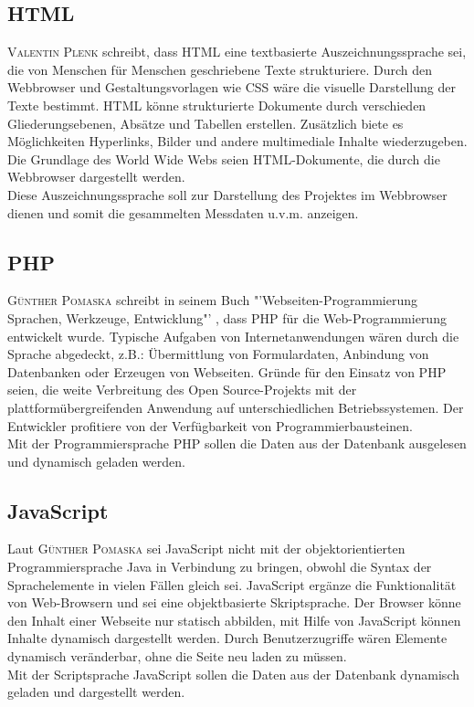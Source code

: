 \subsection{\ac{HTML}}
\textsc{Valentin Plenk}\cite{plenk2017angewandte} schreibt, dass \ac{HTML} eine textbasierte Auszeichnungssprache sei, die von Menschen für Menschen geschriebene Texte strukturiere. Durch den Webbrowser und Gestaltungsvorlagen wie \ac{CSS} wäre die visuelle Darstellung der Texte bestimmt. \ac{HTML} könne strukturierte Dokumente durch verschieden Gliederungsebenen, Absätze und Tabellen erstellen. Zusätzlich biete es Möglichkeiten Hyperlinks, Bilder und andere multimediale Inhalte wiederzugeben. Die Grundlage des World Wide Webs seien \ac{HTML}-Dokumente, die durch die Webbrowser dargestellt werden. \\
Diese Auszeichnungssprache soll zur Darstellung des Projektes im Webbrowser dienen und somit die gesammelten Messdaten u.v.m. anzeigen.

\subsection{\ac{PHP}}\label{PHP}
\textsc{Günther Pomaska} schreibt in seinem Buch "'Webseiten-Programmierung Sprachen, Werkzeuge, Entwicklung"' \cite{pomaska2012webseiten-programmierung}, dass \ac{PHP} für die Web-Programmierung entwickelt wurde. Typische Aufgaben von Internetanwendungen wären durch die Sprache abgedeckt, z.B.: Übermittlung von Formulardaten, Anbindung von Datenbanken oder Erzeugen von Webseiten. Gründe für den Einsatz von \ac{PHP} seien, die weite Verbreitung des Open Source-Projekts mit der plattformübergreifenden Anwendung auf unterschiedlichen Betriebssystemen. Der Entwickler profitiere von der Verfügbarkeit von Programmierbausteinen.\\
Mit der Programmiersprache \ac{PHP} sollen die Daten aus der Datenbank ausgelesen und dynamisch geladen werden.

\subsection{JavaScript}
Laut \textsc{Günther Pomaska} \cite{pomaska2012webseiten-programmierung} sei JavaScript nicht mit der objektorientierten Programmiersprache Java in Verbindung zu bringen, obwohl die Syntax der Sprachelemente in vielen Fällen gleich sei. JavaScript ergänze die Funktionalität von Web-Browsern und sei eine objektbasierte Skriptsprache. Der Browser könne den Inhalt einer Webseite nur statisch abbilden, mit Hilfe von JavaScript können Inhalte dynamisch dargestellt werden. Durch Benutzerzugriffe wären Elemente dynamisch veränderbar, ohne die Seite neu laden zu müssen.\\
Mit der Scriptsprache JavaScript sollen die Daten aus der Datenbank dynamisch geladen und dargestellt werden.

